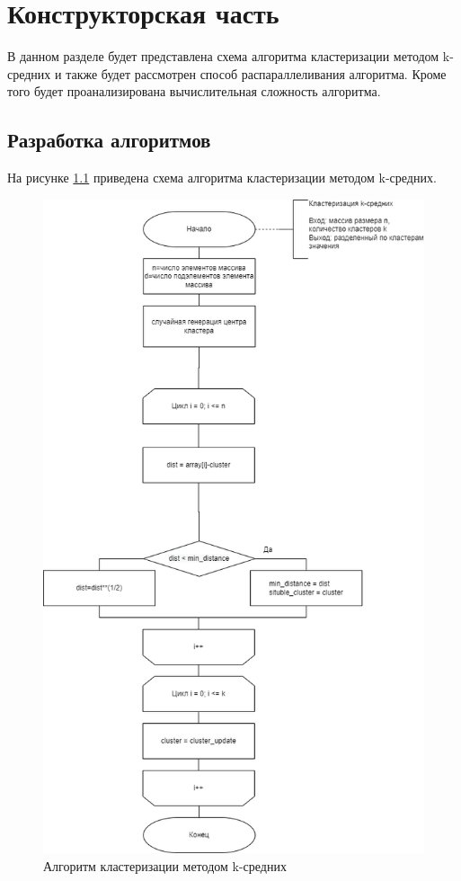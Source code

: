 \chapter{Конструкторская часть}

В данном разделе будет представлена схема алгоритма кластеризации методом k-средних и также будет рассмотрен способ распараллеливания алгоритма. Кроме того будет проанализирована вычислительная сложность алгоритма.

\section{Разработка алгоритмов}

На рисунке \ref{img:standard} приведена схема алгоритма кластеризации методом k-средних. 


\begin{figure}[H]
	\begin{center}
		\includegraphics[scale=0.6]{img/standart.png}
	\end{center}
	\captionsetup{justification=centering}
	\caption{Алгоритм кластеризации методом k-средних}
	\label{img:standard}
\end{figure}


